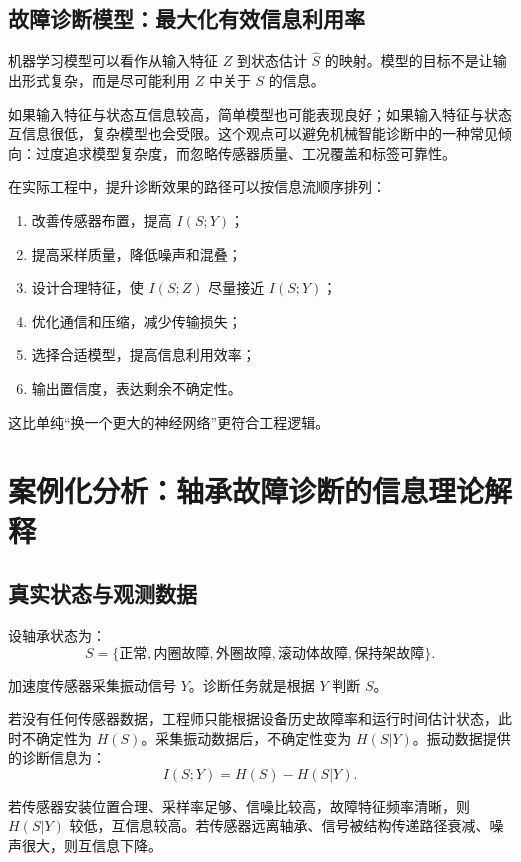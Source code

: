 \documentclass[UTF8,a4paper,12pt]{ctexart}
\begin{document}
\subsection{故障诊断模型：最大化有效信息利用率}

机器学习模型可以看作从输入特征 $Z$ 到状态估计 $\hat S$ 的映射。模型的目标不是让输出形式复杂，而是尽可能利用 $Z$ 中关于 $S$ 的信息。

如果输入特征与状态互信息较高，简单模型也可能表现良好；如果输入特征与状态互信息很低，复杂模型也会受限。这个观点可以避免机械智能诊断中的一种常见倾向：过度追求模型复杂度，而忽略传感器质量、工况覆盖和标签可靠性。

在实际工程中，提升诊断效果的路径可以按信息流顺序排列：
\begin{enumerate}
  \item 改善传感器布置，提高 $I(S;Y)$；
  \item 提高采样质量，降低噪声和混叠；
  \item 设计合理特征，使 $I(S;Z)$ 尽量接近 $I(S;Y)$；
  \item 优化通信和压缩，减少传输损失；
  \item 选择合适模型，提高信息利用效率；
  \item 输出置信度，表达剩余不确定性。
\end{enumerate}

这比单纯“换一个更大的神经网络”更符合工程逻辑。

\section{案例化分析：轴承故障诊断的信息理论解释}

\subsection{真实状态与观测数据}

设轴承状态为：
\[
S=\{\text{正常},\text{内圈故障},\text{外圈故障},\text{滚动体故障},\text{保持架故障}\}.
\]

加速度传感器采集振动信号 $Y$。诊断任务就是根据 $Y$ 判断 $S$。

若没有任何传感器数据，工程师只能根据设备历史故障率和运行时间估计状态，此时不确定性为 $H(S)$。采集振动数据后，不确定性变为 $H(S|Y)$。振动数据提供的诊断信息为：
\begin{equation}
I(S;Y)=H(S)-H(S|Y).
\end{equation}

若传感器安装位置合理、采样率足够、信噪比较高，故障特征频率清晰，则 $H(S|Y)$ 较低，互信息较高。若传感器远离轴承、信号被结构传递路径衰减、噪声很大，则互信息下降。
\end{document}
